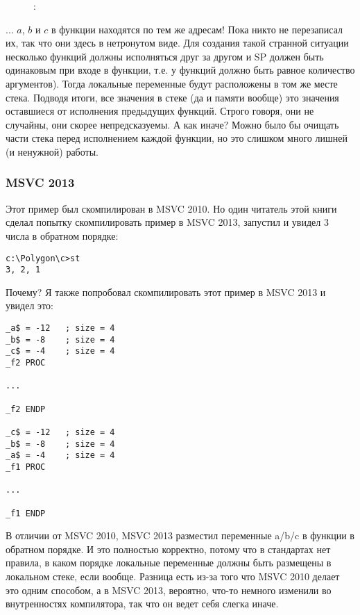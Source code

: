 \begin{figure}[H]
\centering
{}
\caption{\olly: }
\label{fig:stack_noise_olly2}
\end{figure}

... $a$, $b$ и $c$ в функции  находятся по тем же адресам!
Пока никто не перезаписал их, так что они здесь в нетронутом виде.
Для создания такой странной ситуации несколько функций должны исполняться друг за другом
и \ac{SP} должен быть одинаковым при входе в функции, т.е. у функций должно быть равное количество
аргументов). Тогда локальные переменные будут расположены в том же месте стека.
Подводя итоги, все значения в стеке (да и памяти вообще) это значения оставшиеся от 
исполнения предыдущих функций.
Строго говоря, они не случайны, они скорее непредсказуемы.
А как иначе?
Можно было бы очищать части стека перед исполнением каждой функции,
но это слишком много лишней (и ненужной) работы.

\subsubsection{MSVC 2013}

Этот пример был скомпилирован в MSVC 2010.
Но один читатель этой книги сделал попытку скомпилировать пример в MSVC 2013, запустил и увидел 3 числа в обратном порядке:

\begin{lstlisting}
c:\Polygon\c>st
3, 2, 1
\end{lstlisting}

Почему?
Я также попробовал скомпилировать этот пример в MSVC 2013 и увидел это:

\begin{lstlisting}[caption=MSVC 2013]
_a$ = -12	; size = 4
_b$ = -8	; size = 4
_c$ = -4	; size = 4
_f2	PROC

...

_f2	ENDP

_c$ = -12	; size = 4
_b$ = -8	; size = 4
_a$ = -4	; size = 4
_f1	PROC

...

_f1	ENDP
\end{lstlisting}

В отличии от MSVC 2010, MSVC 2013 разместил переменные a/b/c в функции  в обратном порядке.
И это полностью корректно, потому что в стандартах \CCpp нет правила, в каком порядке локальные переменные должны быть размещены в локальном стеке, если вообще.
Разница есть из-за того что MSVC 2010 делает это одним способом, а в MSVC 2013, вероятно, что-то немного изменили во внутренностях компилятора, так что он ведет себя слегка иначе.

